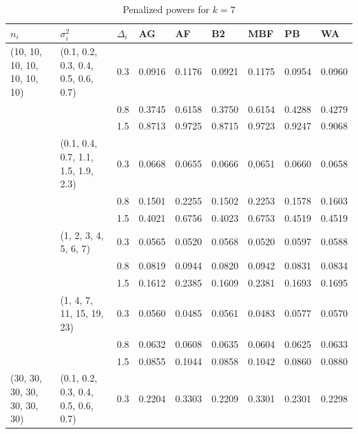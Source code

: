 \begin{table}[h]\footnotesize
\caption{Penalized powers for $k=7$}
\begin{tabular}{lllllllll}\toprule
$n_i$                       & $\sigma_i^2$                               & $\Delta_i$ & AG     & AF     & B2     & MBF    & PB     & WA     \\\toprule
(10, 10, 10, 10, 10, 10, 10) 		& (0.1, 0.2, 0.3, 0.4, 0.5, 0.6, 0.7) 	& 0.3   	& 0.0916 	& 0.1176 	& 0.0921 	& 0.1175 	& 0.0954 	& 0.0960 \\
                             			&                                     			& 0.8   	& 0.3745 	& 0.6158 	& 0.3750 	& 0.6154 	& 0.4288 	& 0.4279 \\
                             			&                                     			& 1.5   	& 0.8713 	& 0.9725 	& 0.8715 	& 0.9723 	& 0.9247 	& 0.9068 \\
                             			& (0.1, 0.4, 0.7, 1.1, 1.5, 1.9, 2.3) 	& 0.3   	& 0.0668 	& 0.0655 	& 0.0666 	& 0,0651 	& 0.0660 	& 0.0658 \\
                             			&                                     			& 0.8   	& 0.1501 	& 0.2255 	& 0.1502 	& 0.2253 	& 0.1578 	& 0.1603 \\
                             			&                                     			& 1.5   	& 0.4021 	& 0.6756 	& 0.4023 	& 0.6753 	& 0.4519 	& 0.4519 \\
                             			& (1, 2, 3, 4, 5, 6, 7)               		& 0.3   	& 0.0565 	& 0.0520 	& 0.0568 	& 0.0520 	& 0.0597 	& 0.0588 \\
                             			&                                     			& 0.8   	& 0.0819 	& 0.0944 	& 0.0820 	& 0.0942 	& 0.0831 	& 0.0834 \\
                             			&                                     			& 1.5   	& 0.1612 	& 0.2385 	& 0.1609 	& 0.2381 	& 0.1693 	& 0.1695 \\
                             			& (1, 4, 7, 11, 15, 19, 23)           		& 0.3   	& 0.0560 	& 0.0485 	& 0.0561 	& 0.0483 	& 0.0577 	& 0.0570 \\
                            			&                                     			& 0.8   	& 0.0632 	& 0.0608 	& 0.0635 	& 0.0604 	& 0.0625 	& 0.0633 \\
                             			&                                     			& 1.5   	& 0.0855 	& 0.1044 	& 0.0858 	& 0.1042 	& 0.0860 	& 0.0880 \\\hline
(30, 30, 30, 30, 30, 30, 30) 	& (0.1, 0.2, 0.3, 0.4, 0.5, 0.6, 0.7) 	& 0.3   	& 0.2204 	& 0.3303 	& 0.2209 	& 0.3301 	& 0.2301 	& 0.2298 \\

\end{tabular}
\end{table}
